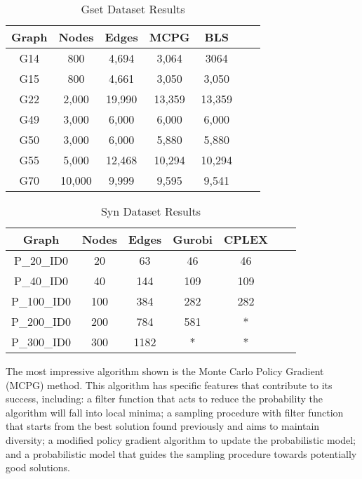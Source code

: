 \documentclass[conference]{IEEEtran}
\begin{document}
\begin{table}[htbp]
\caption{Gset Dataset Results}
\begin{center}
\begin{tabular}{|c|c|c|c|c|c|c|}
\hline
\textbf{Graph} & \textbf{Nodes} & \textbf{Edges} & \textbf{MCPG} & \textbf{BLS} \\
\hline 
G14 & 800& 4,694& 3,064 &3064 \\
\hline
G15 & 800& 4,661& 3,050 & 3,050 \\
\hline
G22 & 2,000& 19,990& 13,359 &13,359 \\
\hline
G49 & 3,000& 6,000& 6,000 &6,000 \\
\hline
G50 & 3,000& 6,000& 5,880 &5,880 \\
\hline
G55 & 5,000& 12,468& 10,294 &10,294 \\
\hline
G70 & 10,000& 9,999 & 9,595 &9,541 \\
\hline
\end{tabular}
\label{tab1}
\end{center}
\end{table}
\begin{table}[htbp]
\caption{Syn Dataset Results}
\begin{center}
\begin{tabular}{|c|c|c|c|c|c|c|}
\hline
\textbf{Graph} & \textbf{Nodes} & \textbf{Edges} & \textbf{Gurobi} & \textbf{CPLEX} \\
\hline 
P\_20\_ID0 & 20 & 63 & 46 & 46 \\
\hline
P\_40\_ID0 & 40 & 144& 109 & 109\\
\hline
P\_100\_ID0 & 100 & 384 & 282 & 282 \\
\hline
P\_200\_ID0 & 200 & 784 & 581 & * \\
\hline
P\_300\_ID0 & 300 & 1182 & * & * \\
\hline
\end{tabular}
\label{tab1}
\end{center}
\end{table}

The most impressive algorithm shown is the Monte Carlo Policy Gradient (MCPG) method. This algorithm has specific features that contribute to its success, including: a filter function that acts to reduce the probability the algorithm will fall into local minima; a sampling procedure with filter function that starts from the best solution found previously and aims to maintain diversity; a modified policy gradient algorithm to update the probabilistic model; and a probabilistic model that guides the sampling procedure towards potentially good solutions.
\end{document}
